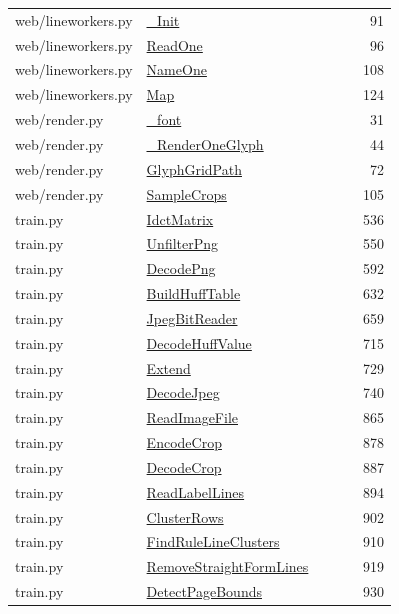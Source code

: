 \documentclass[11pt,a4paper,oneside]{report}
\begin{document}
\begin{longtable}{p{0.28\linewidth}p{0.48\linewidth}r}
web/lineworkers.py & \hyperref[fn:web-lineworkers:-Init]{\_Init} & 91\\
web/lineworkers.py & \hyperref[fn:web-lineworkers:ReadOne]{ReadOne} & 96\\
web/lineworkers.py & \hyperref[fn:web-lineworkers:NameOne]{NameOne} & 108\\
web/lineworkers.py & \hyperref[fn:web-lineworkers:Map]{Map} & 124\\
web/render.py & \hyperref[fn:web-render:-font]{\_font} & 31\\
web/render.py & \hyperref[fn:web-render:-RenderOneGlyph]{\_RenderOneGlyph} & 44\\
web/render.py & \hyperref[fn:web-render:GlyphGridPath]{GlyphGridPath} & 72\\
web/render.py & \hyperref[fn:web-render:SampleCrops]{SampleCrops} & 105\\
train.py & \hyperref[fn:train:IdctMatrix]{IdctMatrix} & 536\\
train.py & \hyperref[fn:train:UnfilterPng]{UnfilterPng} & 550\\
train.py & \hyperref[fn:train:DecodePng]{DecodePng} & 592\\
train.py & \hyperref[fn:train:BuildHuffTable]{BuildHuffTable} & 632\\
train.py & \hyperref[fn:train:JpegBitReader]{JpegBitReader} & 659\\
train.py & \hyperref[fn:train:DecodeHuffValue]{DecodeHuffValue} & 715\\
train.py & \hyperref[fn:train:Extend]{Extend} & 729\\
train.py & \hyperref[fn:train:DecodeJpeg]{DecodeJpeg} & 740\\
train.py & \hyperref[fn:train:ReadImageFile]{ReadImageFile} & 865\\
train.py & \hyperref[fn:train:EncodeCrop]{EncodeCrop} & 878\\
train.py & \hyperref[fn:train:DecodeCrop]{DecodeCrop} & 887\\
train.py & \hyperref[fn:train:ReadLabelLines]{ReadLabelLines} & 894\\
train.py & \hyperref[fn:train:ClusterRows]{ClusterRows} & 902\\
train.py & \hyperref[fn:train:FindRuleLineClusters]{FindRuleLineClusters} & 910\\
train.py & \hyperref[fn:train:RemoveStraightFormLines]{RemoveStraightFormLines} & 919\\
train.py & \hyperref[fn:train:DetectPageBounds]{DetectPageBounds} & 930\\

\end{longtable}
\end{document}
